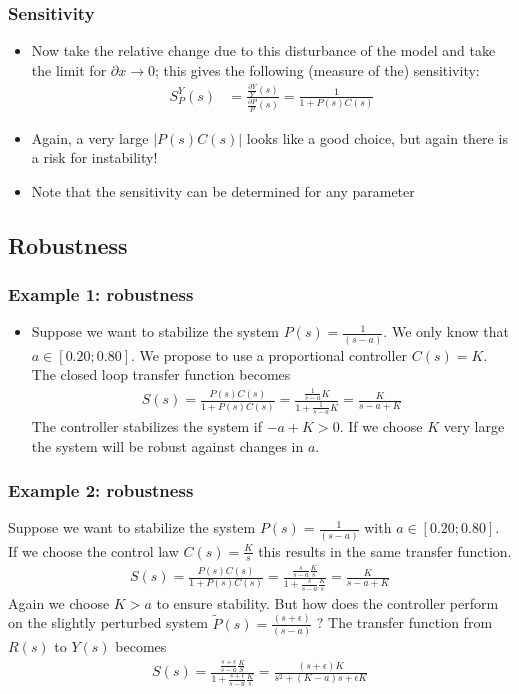 \begin{frame}
	\frametitle{Sensitivity}
	\begin{itemize}
		\item Now take the relative change due to this disturbance of the model and take the limit for $\partial x \rightarrow 0$; this gives the following (measure of the) sensitivity:
		\begin{align*}
			S_P^Y(s) &= \frac{\frac{\partial Y}{Y}(s)}{\frac{\partial P}{P}(s)} = \frac{1}{1 + P(s)C(s)}
		\end{align*}
		\item Again, a very large $\left|P(s)C(s)\right|$ looks like a good choice, but again there is a risk for instability!
		\item Note that the sensitivity can be determined for any parameter	
	\end{itemize}
\end{frame}


\subsection[Robustness]{Robustness}
\begin{frame}
	\frametitle{Example 1: robustness}
	\begin{itemize}
		\item Suppose we want to stabilize the system $P(s)=\frac{1}{(s - a)}$.  We only know that $a \in [0.20;0.80]$. We propose to use a proportional controller $C(s)=K$.
		The closed loop transfer function becomes
		\begin{align*}
			S(s) = \frac{P(s)C(s)}{1+P(s)C(s)} = \frac{\frac{1}{s-a}K}{1+\frac{1}{s-a}K} = \frac{K}{s-a+K}
		\end{align*}
		The controller stabilizes the system if $−a+K>0$. If we choose $K$ very large the system will be robust against changes in $a$.
		
	\end{itemize}
\end{frame}


\begin{frame}
	\frametitle{Example 2: robustness}
	Suppose we want to stabilize the system $P(s)=\frac{1}{(s - a)}$ with $a\in[0.20;0.80]$. If we choose the control law $C(s)=\frac{K}{s}$ this results in the same transfer function.
	\begin{align*}
		S(s) = \frac{P(s)C(s)}{1+P(s)C(s)} = \frac{\frac{s}{s-a}\frac{K}{s}}{1+\frac{s}{s-a} \frac{K}{s}} = \frac{K}{s-a+K}
	\end{align*}
	Again we choose $K>a$ to ensure stability.
	But how does the controller perform on the slightly perturbed system $\tilde{P}(s)=\frac{(s+\epsilon)}{(s - a)}$  ?
	The transfer function from $R(s)$ to $Y(s)$ becomes
	\begin{align*}
		S(s) = \frac{\frac{s+\epsilon}{s-a} \frac{K}{S}}{1+\frac{s+\epsilon}{s-a}\frac{K}{s}}
		= \frac{(s+\epsilon)K}{s^2 + (K-a)s + \epsilon K}
	\end{align*}
\end{frame}

